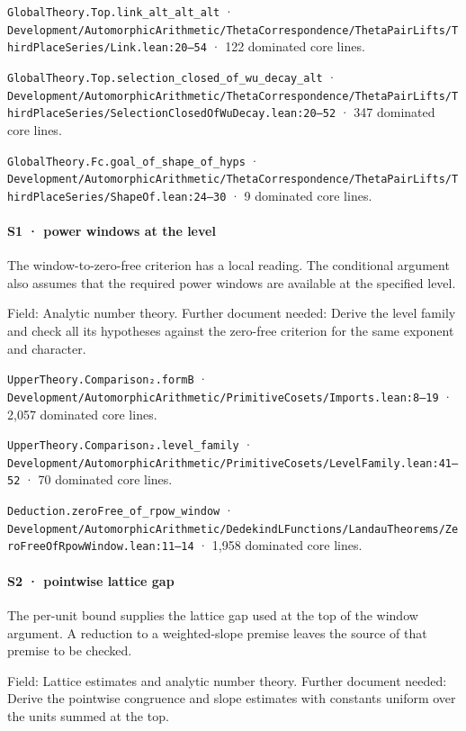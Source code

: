 \nolinkurl{GlobalTheory.Top.link_alt_alt_alt} · \nolinkurl{Development/AutomorphicArithmetic/ThetaCorrespondence/ThetaPairLifts/ThirdPlaceSeries/Link.lean:20–54} · 122 dominated core lines.

\nolinkurl{GlobalTheory.Top.selection_closed_of_wu_decay_alt} · \nolinkurl{Development/AutomorphicArithmetic/ThetaCorrespondence/ThetaPairLifts/ThirdPlaceSeries/SelectionClosedOfWuDecay.lean:20–52} · 347 dominated core lines.

\nolinkurl{GlobalTheory.Fc.goal_of_shape_of_hyps} · \nolinkurl{Development/AutomorphicArithmetic/ThetaCorrespondence/ThetaPairLifts/ThirdPlaceSeries/ShapeOf.lean:24–30} · 9 dominated core lines.

\paragraph{S1 · power windows at the level}

The window-to-zero-free criterion has a local reading. The conditional argument also assumes that the required power windows are available at the specified level.

Field: Analytic number theory. Further document needed: Derive the level family and check all its hypotheses against the zero-free criterion for the same exponent and character.

\nolinkurl{UpperTheory.Comparison₂.formB} · \nolinkurl{Development/AutomorphicArithmetic/PrimitiveCosets/Imports.lean:8–19} · 2,057 dominated core lines.

\nolinkurl{UpperTheory.Comparison₂.level_family} · \nolinkurl{Development/AutomorphicArithmetic/PrimitiveCosets/LevelFamily.lean:41–52} · 70 dominated core lines.

\nolinkurl{Deduction.zeroFree_of_rpow_window} · \nolinkurl{Development/AutomorphicArithmetic/DedekindLFunctions/LandauTheorems/ZeroFreeOfRpowWindow.lean:11–14} · 1,958 dominated core lines.

\paragraph{S2 · pointwise lattice gap}

The per-unit bound supplies the lattice gap used at the top of the window argument. A reduction to a weighted-slope premise leaves the source of that premise to be checked.

Field: Lattice estimates and analytic number theory. Further document needed: Derive the pointwise congruence and slope estimates with constants uniform over the units summed at the top.


